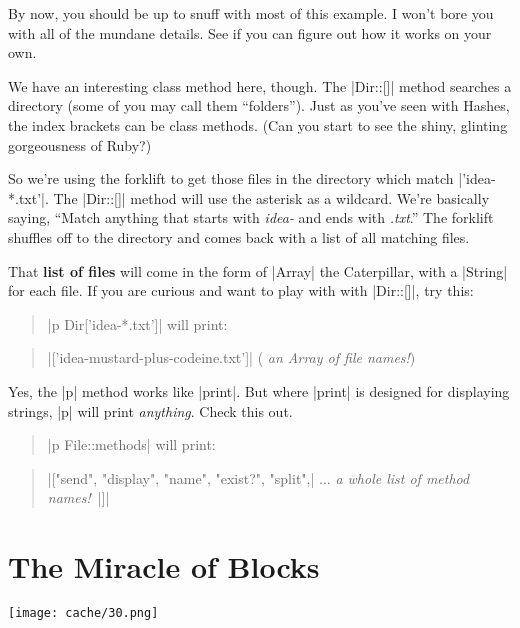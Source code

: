 \documentclass[12pt,twoside]{report}
\begin{document}
By now, you should be up to snuff with most of this example.  I won't
bore you with all of the mundane details.  See if you can figure out
how it works on your own.

We have an interesting class method here, though.  The
\rubyinline|Dir::[]| method searches a directory (some
of you may call them ``folders'').  Just as you've seen with Hashes,
the index brackets can be class methods.  (Can you start to see the
shiny, glinting gorgeousness of Ruby?)

So we're using the forklift to get those files in the directory which
match \rubyinline|'idea-*.txt'|.  The
\rubyinline|Dir::[]| method will use the asterisk as a
wildcard.  We're basically saying, ``Match anything that starts with
{\em idea-} and ends with {\em .txt}.''  The forklift shuffles off to
the directory and comes back with a list of all matching files.

That {\bf list of files} will come in the form of
\rubyinline|Array| the Caterpillar, with a
\rubyinline|String| for each file.  If you are curious
and want to play with with \rubyinline|Dir::[]|, try
this:

\begin{quote}
\rubyinline|p Dir['idea-*.txt']| will
print:\end{quote}


\begin{quote}
\rubyinline|['idea-mustard-plus-codeine.txt']| ({\em
  an Array of file names!})\end{quote}


Yes, the \rubyinline|p| method works like
\rubyinline|print|.  But where
\rubyinline|print| is designed for displaying strings,
\rubyinline|p| will print {\em anything}.  Check this
out.

\begin{quote}
\rubyinline|p File::methods| will print:\end{quote}


\begin{quote}
\rubyinline|["send", "display", "name", "exist?", "split",|
 ... {\em a whole list of method names!}~\rubyinline|]|\end{quote}



\section{The Miracle of Blocks}


	\texttt{[image: cache/30.png]}
\end{document}
